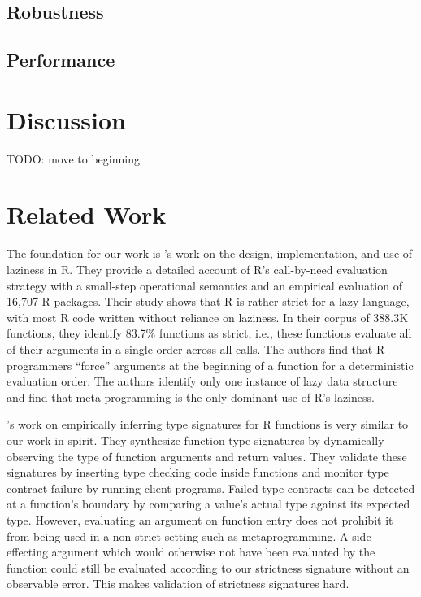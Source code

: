 \documentclass[screen,acmsmall]{acmart}
\begin{document}
\subsection{Robustness}

\subsection{Performance}

\section{Discussion}

TODO: move to beginning
\section{Related Work}
The foundation for our work is \cite{oopsla19b}'s work on the design,
implementation, and use of laziness in R. They provide a detailed account of R's
call-by-need evaluation strategy with a small-step operational semantics and an
empirical evaluation of 16,707 R packages. Their study shows that R is rather
strict for a lazy language, with most R code written without reliance on
laziness. In their corpus of 388.3K functions, they identify 83.7\% functions as
strict, i.e., these functions evaluate all of their arguments in a single order
across all calls. The authors find that R programmers ``force'' arguments at the
beginning of a function for a deterministic evaluation order. The authors
identify only one instance of lazy data structure and find that meta-programming
is the only dominant use of R's laziness.

\cite{oopsla20b}'s work on empirically inferring type signatures for R functions
is very similar to our work in spirit. They synthesize function type signatures
by dynamically observing the type of function arguments and return values. They
validate these signatures by inserting type checking code inside functions and
monitor type contract failure by running client programs. Failed type contracts
can be detected at a function's boundary by comparing a value's actual type
against its expected type. However, evaluating an argument on function entry
does not prohibit it from being used in a non-strict setting such as
metaprogramming. A side-effecting argument which would otherwise not have been
evaluated by the function could still be evaluated according to our strictness
signature without an observable error. This makes validation of strictness
signatures hard.
\end{document}

